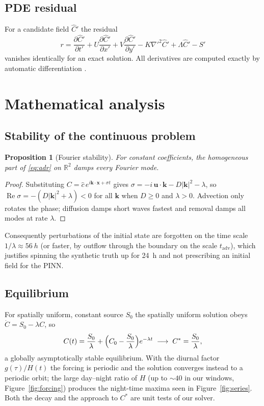 \documentclass[11pt,a4paper]{article}
\newtheorem{proposition}{Proposition}
\newcommand{\pd}[2]{\frac{\partial #1}{\partial #2}}
\begin{document}
\subsection{PDE residual}
For a candidate field $\hat C'$ the residual
\begin{equation}
r = \pd{\hat C'}{t'} + U\pd{\hat C'}{x'} + V\pd{\hat C'}{y'} - K\nabla'^2\hat C' + \Lambda\hat C' - S'
\label{eq:residual}
\end{equation}
vanishes identically for an exact solution. All derivatives are computed exactly by automatic
differentiation \citep{baydin2018}.

\section{Mathematical analysis}
\label{sec:analysis}
\subsection{Stability of the continuous problem}
\begin{proposition}[Fourier stability]
For constant coefficients, the homogeneous part of \eqref{eq:adr} on $\mathbb R^2$ damps every Fourier mode.
\end{proposition}
\begin{proof}
Substituting $C=\hat c\,e^{i\bm k\cdot\bm x+\sigma t}$ gives
$\sigma = -i\,\bm u\cdot\bm k - D|\bm k|^2 - \lambda$, so $\operatorname{Re}\sigma=-(D|\bm k|^2+\lambda)<0$ for
all $\bm k$ when $D\ge0$ and $\lambda>0$. Advection only rotates the phase; diffusion damps short waves
fastest and removal damps all modes at rate $\lambda$.
\end{proof}
Consequently perturbations of the initial state are forgotten on the time scale $1/\lambda\approx\SI{56}{h}$ (or
faster, by outflow through the boundary on the scale $t_{\mathrm{adv}}$), which justifies spinning the synthetic
truth up for 24~h and not prescribing an initial field for the PINN.

\subsection{Equilibrium}
For spatially uniform, constant source $S_0$ the spatially uniform solution obeys $\dot C=S_0-\lambda C$, so
\begin{equation}
C(t)=\frac{S_0}{\lambda}+\Bigl(C_0-\frac{S_0}{\lambda}\Bigr)e^{-\lambda t}\;\longrightarrow\;C^*=\frac{S_0}{\lambda},
\end{equation}
a globally asymptotically stable equilibrium. With the diurnal factor $g(\tau)/H(t)$ the forcing is periodic and
the solution converges instead to a periodic orbit; the large day--night ratio of $H$ (up to $\sim40$ in our
windows, Figure~\ref{fig:forcing}) produces the night-time maxima seen in Figure~\ref{fig:series}. Both the decay
and the approach to $C^*$ are unit tests of our solver.
\end{document}
